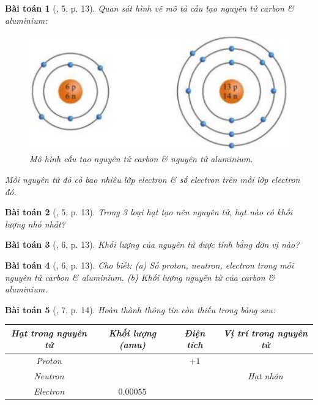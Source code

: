 \documentclass{article}
\newtheorem{baitoan}{Bài toán}
\begin{document}
\begin{baitoan}[\cite{SGK_KHTN_7_Canh_Dieu}, 5, p. 13]
	Quan sát hình vẽ mô tả cấu tạo nguyên tử carbon \& aluminium:
	\begin{figure}[H]
		\centering
		\includegraphics[scale=0.4]{carbon_aluminium}
		\caption{Mô hình cấu tạo nguyên tử carbon \& nguyên tử aluminium.}
	\end{figure}
	\noindent Mỗi nguyên tử đó có bao nhiêu lớp electron \& số electron trên mỗi lớp electron đó.
\end{baitoan}

\begin{baitoan}[\cite{SGK_KHTN_7_Canh_Dieu}, 5, p. 13]
	Trong 3 loại hạt tạo nên nguyên tử, hạt nào có khối lượng nhỏ nhất?
\end{baitoan}

\begin{baitoan}[\cite{SGK_KHTN_7_Canh_Dieu}, 6, p. 13]
	Khối lượng của nguyên tử được tính bằng đơn vị nào?
\end{baitoan}

\begin{baitoan}[\cite{SGK_KHTN_7_Canh_Dieu}, 6, p. 13]
	Cho biết: (a) Số proton, neutron, electron trong mỗi nguyên tử carbon \& aluminium. (b) Khối lượng nguyên tử của carbon \& aluminium.
\end{baitoan}

\begin{baitoan}[\cite{SGK_KHTN_7_Canh_Dieu}, 7, p. 14]
	Hoàn thành thông tin còn thiếu trong bảng sau:
	\begin{table}[H]
		\centering
		\begin{tabular}{|c|c|c|c|}
			\hline
			Hạt trong nguyên tử & Khối lượng (amu) & Điện tích & Vị trí trong nguyên tử \\
			\hline
			Proton &  & $+1$ &  \\
			\hline
			Neutron &  &  & Hạt nhân \\
			\hline
			Electron & $0.00055$ &  &  \\
			\hline
		\end{tabular}
	\end{table}
\end{baitoan}
\end{document}
